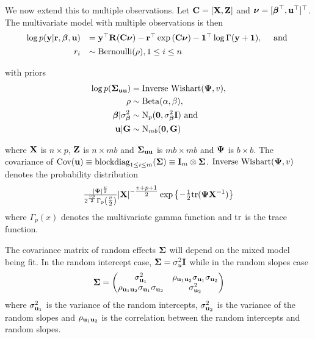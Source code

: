 \noindent We now extend this to multiple observations. Let ${\bf C} = [{\bf X}, {\bf Z}]$ and ${\boldsymbol \nu} = [{\boldsymbol \beta}^\top, {\bf u}^\top]^\top$. The multivariate model with multiple observations is then
$$
	\begin{array}{rl}
		\log{p({\bf y}|{\bf r}, {\boldsymbol\beta}, {\bf u})} & = {\bf y}^\top {\bf R} ({\bf C}{\boldsymbol \nu}) - {\bf r}^\top \exp{({\bf C}{\boldsymbol\nu})} - {\bf 1}^\top \log{\Gamma{({\bf y}+ {\bf1})}}, \quad \mbox{ and } \\ [1ex]
		r_i                           & \sim \text{Bernoulli}(\rho), 1 \leq i \leq n                                                                     \\
	\end{array}
$$

\noindent with priors
\begin{align*}
	\log{p({\boldsymbol\Sigma}_{{\bf u}{\bf u}})} & = \text{Inverse Wishart}({\boldsymbol \Psi}, v),    \\
	\rho                       & \sim \text{Beta}(\alpha, \beta),             \\
	{\boldsymbol \beta}|\sigma^2_{\boldsymbol \beta}     & \sim \text{N}_p({\bf 0}, \sigma^2_{\boldsymbol \beta} {\bf I}) \text{ and } \\
	{\bf u}|{\bf G}       & \sim \text{N}_{mb}({\bf 0}, {\bf G})              
\end{align*}

\noindent where ${\bf X}$ is $n \times p$, ${\bf Z}$ is $n \times mb$ and ${\boldsymbol \Sigma}_{{\bf u} {\bf u}}$ is $mb \times mb$ and
${\boldsymbol \Psi}$ is $b \times b$. The covariance of $\mbox{Cov}({\bf u}) \equiv \text{blockdiag}_{1 \leq i \leq m} ({\boldsymbol \Sigma}) \equiv
{\bf I}_m \otimes {\boldsymbol\Sigma}$. $\text{Inverse Wishart}({\boldsymbol \Psi}, v)$ denotes the probability distribution
$$\tfrac{|{\boldsymbol \Psi}|^\frac{v}{2}}{2^{\frac{vp}{2}} \Gamma_p{\left(\tfrac{v}{2}\right)}} |{\bf X}|^{-\tfrac{v + p + 1}{2}}
\exp{\left\{-\tfrac{1}{2} \text{tr}{({\boldsymbol\Psi}{\bf X}^{-1})}\right\}}$$ where $\Gamma_p{(x)}$ denotes the multivariate gamma function and $\text{tr}$
is the trace function.

The covariance matrix of random effects ${\boldsymbol \Sigma}$ will depend on the mixed model being fit. In the random
intercept case, ${\boldsymbol \Sigma} = \sigma_u^2 {\bf I}$ while in the random slopes case
\[
	{\boldsymbol \Sigma} = 
	\begin{pmatrix}
		\sigma_{{\bf u}_1}^2                                 & \rho_{{\bf u}_1 {\bf u}_2} \sigma_{{\bf u}_1} \sigma_{{\bf u}_2} \\
		\rho_{{\bf u}_1 {\bf u}_2} \sigma_{{\bf u}_1} \sigma_{{\bf u}_2} & \sigma_{{\bf u}_2}^2                                 
	\end{pmatrix}
\]
where $\sigma_{{\bf u}_1}^2$ is the variance of the random intercepts, $\sigma_{{\bf u}_2}^2$ is the variance of the
random slopes and $\rho_{{\bf u}_1 {\bf u}_2}$ is the correlation between the random intercepts and random slopes.

